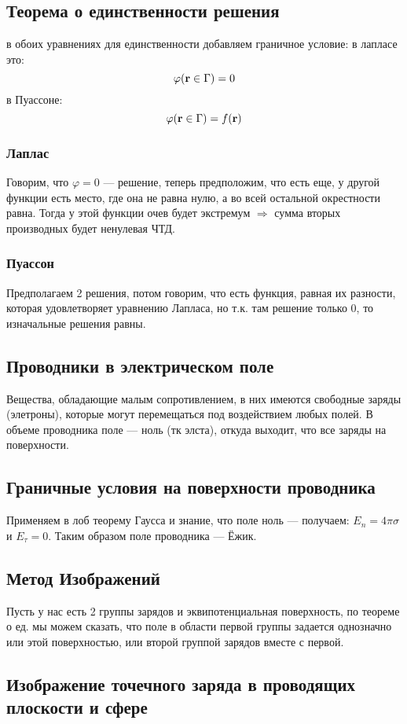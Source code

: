 \documentclass[a4paper,12pt]{article} %
\begin{document}
\subsection{Теорема о единственности решения}
в обоих уравнениях для единственности добавляем граничное условие: в лапласе это: $$\varphi({\bf r} \in \Gamma) = 0$$
в Пуассоне: $$\varphi({\bf r} \in \Gamma) = f({\bf r})$$
\subsubsection{Лаплас}
Говорим, что $\varphi = 0$ --- решение, теперь предположим, что есть еще, у другой функции есть место, где она не равна нулю, а во всей остальной окрестности равна. Тогда у этой функции очев будет экстремум $\Rightarrow$  сумма вторых производных будет ненулевая ЧТД.
\subsubsection{Пуассон}
Предполагаем 2 решения, потом говорим, что есть функция, равная их разности, которая удовлетворяет уравнению Лапласа, но т.к. там решение только 0, то изначальные решения равны.
\subsection{Проводники в электрическом поле}
Вещества, обладающие малым сопротивлением, в них имеются свободные заряды (элетроны), которые могут перемещаться под воздействием любых полей. В объеме проводника поле --- ноль (тк элста), откуда выходит, что все заряды на поверхности.
\subsection{Граничные условия на поверхности проводника}
Применяем в лоб теорему Гаусса и знание, что поле ноль --- получаем: $E_n = 4 \pi \sigma$ и $E_{\tau} = 0$.
Таким образом поле проводника --- Ёжик.
\subsection{Метод Изображений}
Пусть у нас есть 2 группы зарядов и эквипотенциальная поверхность, по теореме о ед. мы можем сказать, что поле в области первой группы задается однозначно или этой поверхностью, или второй группой зарядов вместе с первой.
\subsection{Изображение точечного заряда в проводящих плоскости и сфере}
\end{document}
